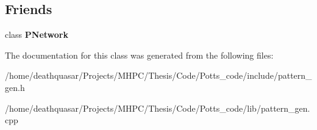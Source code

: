 \subsection*{Friends}
\begin{DoxyCompactItemize}
\item 
class {\bfseries P\+Network}\hypertarget{classPatternGen_af18c1bfc19f67a8a280667eb030fb0d2}{}\label{classPatternGen_af18c1bfc19f67a8a280667eb030fb0d2}

\end{DoxyCompactItemize}


The documentation for this class was generated from the following files\+:\begin{DoxyCompactItemize}
\item 
/home/deathquasar/\+Projects/\+M\+H\+P\+C/\+Thesis/\+Code/\+Potts\+\_\+code/include/pattern\+\_\+gen.\+h\item 
/home/deathquasar/\+Projects/\+M\+H\+P\+C/\+Thesis/\+Code/\+Potts\+\_\+code/lib/pattern\+\_\+gen.\+cpp\end{DoxyCompactItemize}
